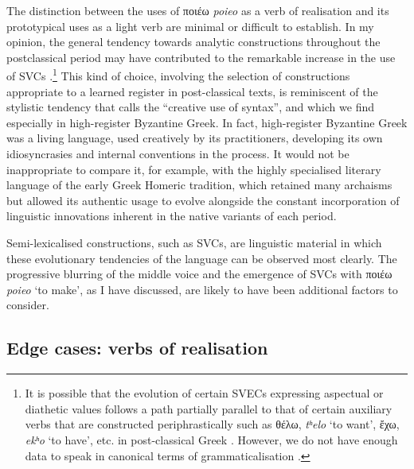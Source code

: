 \documentclass[output=paper,colorlinks,citecolor=brown]{langscibook}
\begin{document}
The distinction between the uses of ποιέω \textit{poieo} as a verb of realisation and its prototypical uses as a light verb are minimal or difficult to establish.
In my opinion, the general tendency towards analytic
constructions throughout the postclassical period may have contributed to the remarkable
increase in the use of SVCs
\parencites{HorrocksGeoffrey-2014183,HoltonDavidandManolesouIo-2010807}.\footnote{It is
  possible that the evolution of certain SVECs expressing aspectual or diathetic values
  follows a path partially parallel to that of certain auxiliary verbs that are
  constructed periphrastically such as θέλω, \emph{tʰelo} `to want',
  ἔχω, \emph{ekʰo} `to have', etc. in post-classical Greek
  \parencite{MarkopoulosTheodore-2009295}. However, we do not have enough data to speak in
  canonical terms of grammaticalisation \parencite{ButtMiriam-2010672}.} This kind of
choice, involving the selection of constructions appropriate to a learned register in
post-classical texts, is reminiscent of the stylistic tendency that
\citet{HorrocksGeoffrey-2020667} calls the ``creative use of syntax'', and which we find
especially in high-register Byzantine Greek. In fact, high-register Byzantine Greek was a
living language, used creatively by its practitioners, developing its own idiosyncrasies
and internal conventions in the process. It would not be inappropriate to compare it, for
example, with the highly specialised literary language of the early Greek Homeric
tradition, which retained many archaisms but allowed its authentic usage to evolve
alongside the constant incorporation of linguistic innovations inherent in the native
variants of each period.

Semi-lexicalised constructions, such as SVCs, are linguistic material in
which these evolutionary tendencies of the language can be observed most
clearly. The progressive blurring of the middle voice and the emergence
of SVCs with ποιέω \emph{poieo} `to make', as I have discussed, are
likely to have been additional factors to consider.

\subsection{Edge cases: verbs of realisation}\label{sec:vc:5:2}
\end{document}
